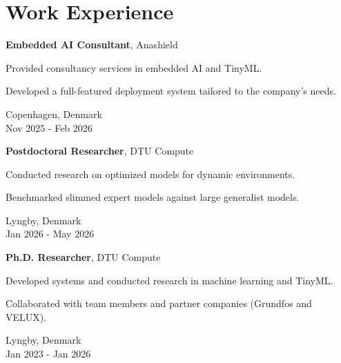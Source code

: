 
\section{Work Experience}
    \multicolentry{*, 3.8cm}
    {
        \textbf{Embedded AI Consultant}, Anashield
        \begin{highlights}
            \item Provided consultancy services in embedded AI and TinyML.
            \item Developed a full-featured deployment system tailored to the company's needs.
        \end{highlights}
    }
    {\raggedleft Copenhagen, Denmark\\Nov 2025 - Feb 2026}

    \vspace{0.2 cm}

    \multicolentry{*, 3.8cm}
    {
        \textbf{Postdoctoral Researcher}, DTU Compute
        \begin{highlights}
            \item Conducted research on optimized models for dynamic environments.
            \item Benchmarked slimmed expert models against large generalist models.
        \end{highlights}
    }
    {\raggedleft Lyngby, Denmark\\Jan 2026 - May 2026}

    \vspace{0.2 cm}

    \multicolentry{*, 3.8cm}
    {
        \textbf{Ph.D. Researcher}, DTU Compute
        \begin{highlights}
            \item Developed systems and conducted research in machine learning and TinyML.
            \item Collaborated with team members and partner companies (Grundfos and VELUX).
        \end{highlights}
    }
    {\raggedleft Lyngby, Denmark\\Jan 2023 - Jan 2026}
